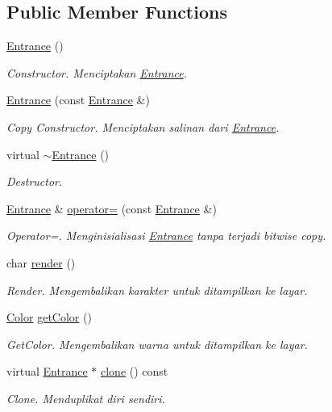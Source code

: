 \subsection*{Public Member Functions}
\begin{DoxyCompactItemize}
\item 
\hyperlink{classEntrance_a88cd27875093371afa47ac0f321716d7}{Entrance} ()
\begin{DoxyCompactList}\small\item\em Constructor. Menciptakan \hyperlink{classEntrance}{Entrance}. \end{DoxyCompactList}\item 
\hyperlink{classEntrance_abecc3f2ef74f5e1a7304ff6778c58ab9}{Entrance} (const \hyperlink{classEntrance}{Entrance} \&)
\begin{DoxyCompactList}\small\item\em Copy Constructor. Menciptakan salinan dari \hyperlink{classEntrance}{Entrance}. \end{DoxyCompactList}\item 
virtual \hyperlink{classEntrance_a05919fe3f4948ea3266b5dd4c5e119ac}{$\sim$\+Entrance} ()
\begin{DoxyCompactList}\small\item\em Destructor. \end{DoxyCompactList}\item 
\hyperlink{classEntrance}{Entrance} \& \hyperlink{classEntrance_ac2a663bd035fd2f6c894165c4ee16a97}{operator=} (const \hyperlink{classEntrance}{Entrance} \&)
\begin{DoxyCompactList}\small\item\em Operator=. Menginisialisasi \hyperlink{classEntrance}{Entrance} tanpa terjadi bitwise copy. \end{DoxyCompactList}\item 
char \hyperlink{classEntrance_a7a2870f72aa2e300896b3fa78c8dcba9}{render} ()
\begin{DoxyCompactList}\small\item\em Render. Mengembalikan karakter untuk ditampilkan ke layar. \end{DoxyCompactList}\item 
\hyperlink{color_8h_ab87bacfdad76e61b9412d7124be44c1c}{Color} \hyperlink{classEntrance_aa0a541a0507a74635e08ccab7b9d6953}{get\+Color} ()
\begin{DoxyCompactList}\small\item\em Get\+Color. Mengembalikan warna untuk ditampilkan ke layar. \end{DoxyCompactList}\item 
virtual \hyperlink{classEntrance}{Entrance} $\ast$ \hyperlink{classEntrance_a5f20360c5b495b5ed4163deb33ff06de}{clone} () const 
\begin{DoxyCompactList}\small\item\em Clone. Menduplikat diri sendiri. \end{DoxyCompactList}\end{DoxyCompactItemize}

